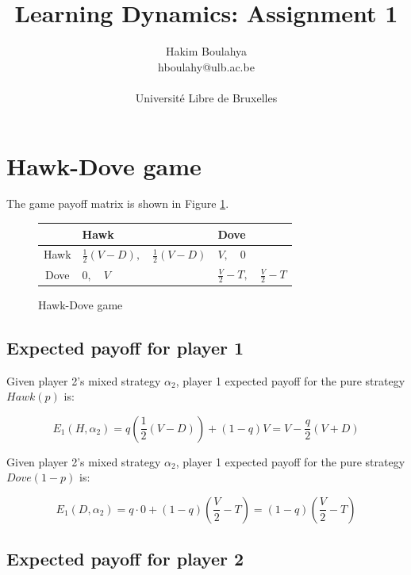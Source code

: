 \documentclass[letterpaper]{article}
\title{Learning Dynamics: Assignment 1}
\author{\Large Hakim Boulahya \\
hboulahy@ulb.ac.be\\
\\
Université Libre de Bruxelles
}
\begin{document}
\maketitle
\tableofcontents
\section{Hawk-Dove game}

The game payoff matrix is shown in Figure \ref{fig:hawkdove}.

\begin{figure}[!ht]


\begin{center}
\begin{tabular}{|c|C|C|}
    \hline
     & Hawk & Dove \\[10pt]
    \hline
    Hawk & $\frac{1}{2}(V - D), \quad \frac{1}{2}(V - D)$ & $V, \quad 0$\\[10pt]
    \hline
    Dove & $0, \quad V$ & $\frac{V}{2} - T, \quad \frac{V}{2} - T$\\[10pt]
    \hline
\end{tabular}
\end{center}

\caption{Hawk-Dove game}
\label{fig:hawkdove}
\end{figure}

\subsection{Expected payoff for player 1}

Given player 2’s mixed strategy $\alpha_2$, player 1 expected payoff
for the pure strategy $Hawk(p)$ is:

\begin{equation}
    E_1(H, \alpha_2) = q (\frac{1}{2}(V - D)) + (1 - q)V
    = V - \frac{q}{2}(V + D)
\end{equation}

Given player 2’s mixed strategy $\alpha_2$, player 1 expected payoff
for the pure strategy $Dove(1 - p)$ is:

\begin{equation}
    E_1(D, \alpha_2) = q \cdot 0 + (1 - q)(\frac{V}{2} - T)
    = (1 - q)(\frac{V}{2} - T)
\end{equation}

\subsection{Expected payoff for player 2}
\end{document}
